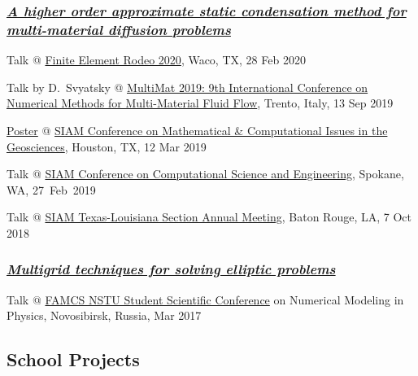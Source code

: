 \documentclass[a4paper,12pt]{article}
\begin{document}
	\subsubsection*{\textit{\href{https://www.researchgate.net/publication/335880120_A_higher_order_approximate_static_condensation_method_for_multi-material_diffusion_problems}{A higher order approximate static condensation method for multi-material diffusion problems}}}	
	\begin{etaremune}[resume]
		\item Talk @ \href{https://www.baylor.edu/math/index.php?id=966337}{Finite Element Rodeo 2020}, Waco, TX, 28 Feb 2020
		\item Talk by D.~Svyatsky @ \href{https://webmagazine.unitn.it/en/evento/dicam/44676/multimat2019}{MultiMat 2019: 9th International Conference on Numerical Methods for Multi-Material Fluid Flow}, Trento, Italy, 13 Sep 2019	
		\item \href{https://www.researchgate.net/publication/331674777_Generalized_approximate_static_condensation_method_for_a_heterogeneous_multi-material_diffusion_problem}{Poster} @ \href{https://www.siam.org/Conferences/CM/Main/gs19}{SIAM Conference on Mathematical \& Computational Issues in the Geosciences}, Houston, TX, 12 Mar 2019
		\item Talk @ \href{https://www.siam.org/Conferences/CM/Main/cse19}{SIAM Conference on Computational Science and Engineering}, Spokane, WA, 27~Feb~2019
		\item Talk @ \href{https://www.siam.org/Conferences/CM/Main/txla18}{SIAM Texas-Louisiana Section Annual Meeting}, Baton Rouge, LA, 7 Oct 2018
	\end{etaremune}
	\subsubsection*{\textit{\href{https://www.researchgate.net/publication/316884102_Mnogosetocnye_metody_resenia_ellipticeskih_zadac}{Multigrid techniques for solving elliptic problems}}}	
	\begin{etaremune}[resume]		
		\item Talk @ \href{https://ami.nstu.ru/o-fakultete/news/1699/}{FAMCS NSTU Student Scientific Conference} on Numerical Modeling in Physics, Novosibirsk, Russia, Mar 2017
	\end{etaremune}

	\subsection*{School Projects}
	
\end{document}
